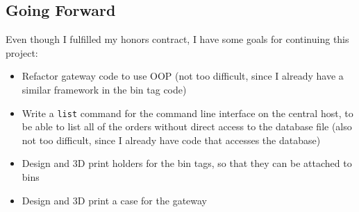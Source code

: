 \documentclass{article}
\begin{document}
\subsection{Going Forward}\label{going-forward}

Even though I fulfilled my honors contract, I have some goals for
continuing this project:

\begin{itemize}
\item
  Refactor gateway code to use OOP (not too difficult, since I already
  have a similar framework in the bin tag code)
\item
  Write a \texttt{list} command for the command line interface on the
  central host, to be able to list all of the orders without direct
  access to the database file (also not too difficult, since I already
  have code that accesses the database)
\item
  Design and 3D print holders for the bin tags, so that they can be
  attached to bins
\item
  Design and 3D print a case for the gateway
\end{itemize}
\end{document}
